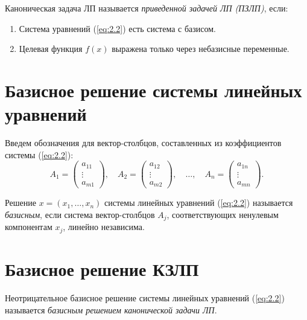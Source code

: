 \begin{definition}
	Каноническая задача ЛП называется \emph{приведенной задачей ЛП (ПЗЛП)}, если:
	\begin{enumerate}
		\item Система уравнений (\ref{eq:2.2}) есть система с базисом.
		\item Целевая функция $ f(x) $ выражена только через небазисные переменные.
	\end{enumerate}
\end{definition}

\section{Базисное решение системы линейных уравнений}

Введем обозначения для вектор-столбцов, составленных из коэффициентов системы (\ref{eq:2.2}):
\[
	A_1 = \left(\begin{matrix}
			a_{11} \\ \vdots \\ a_{m1}
		\end{matrix}\right), \quad A_2 = \left(\begin{matrix}
			a_{12} \\ \vdots \\ a_{m2}
		\end{matrix}\right), \quad \ldots, \quad A_n = \left(\begin{matrix}
			a_{1n} \\ \vdots \\ a_{mn}
		\end{matrix}\right).
\]

\begin{definition}
	Решение $ x = (x_1,\ldots,x_n) $ системы линейных уравнений (\ref{eq:2.2}) называется \emph{базисным}, если система вектор-столбцов $ A_j $, соответствующих ненулевым компонентам $ x_j $, линейно независима.
\end{definition}

\section{Базисное решение КЗЛП}

\begin{definition}
	Неотрицательное базисное решение системы линейных уравнений (\ref{eq:2.2}) называется \emph{базисным решением канонической задачи ЛП}.
\end{definition}

